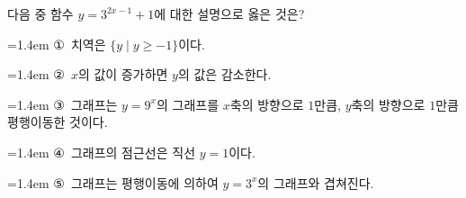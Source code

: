 다음 중 함수 $y=3^{2x-1}+1$에 대한 설명으로 옳은 것은?
\par\medskip\par\noindent\hangindent=1.4em {\small ①}\ 치역은 $\{y \mid y\ge -1\}$이다.\par\noindent\hangindent=1.4em {\small ②}\ $x$의 값이 증가하면 $y$의 값은 감소한다.\par\noindent\hangindent=1.4em {\small ③}\ 그래프는 $y=9^x$의 그래프를 $x$축의 방향으로 $1$만큼, $y$축의 방향으로 $1$만큼 평행이동한 것이다.\par\noindent\hangindent=1.4em {\small ④}\ 그래프의 점근선은 직선 $y=1$이다.\par\noindent\hangindent=1.4em {\small ⑤}\ 그래프는 평행이동에 의하여 $y=3^x$의 그래프와 겹쳐진다.\par\medskip
